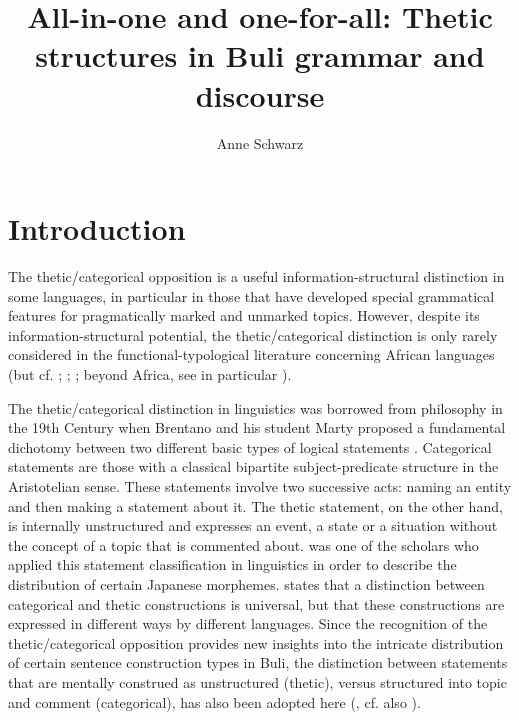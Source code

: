 \documentclass[output=paper]{langsci/langscibook}
\title{All-in-one and one-for-all: Thetic structures in Buli grammar and discourse}
\author{%
 Anne Schwarz \affiliation{Universidad Regional Amazónica IKIAM}
}
\begin{document}
 

\section{Introduction}

The thetic/categorical opposition is a useful information-structural distinction in some languages, in particular in those that have developed special grammatical features for pragmatically marked and unmarked topics. However, despite its information-structural potential, the thetic/categorical distinction is only rarely considered in the functional-typological literature concerning African languages (but cf. \citealt{Güldemann1996,Güldemann2010,Güldemann2012}; \citealt[250-253]{FiedlerEtAl2010}; \citealt{Schwarz2010a}; beyond Africa, see in particular \citealt{Kuroda1972,Sasse1987,Sasse1995,Lambrecht1987,Lambrecht2000,Ulrich1988}). 

The thetic/categorical distinction in linguistics was borrowed from philosophy in the 19th Century when Brentano and his student Marty proposed a fundamental dichotomy between two different basic types of logical statements \citep[535]{Sasse1987}. Categorical statements are those with a classical bipartite subject-predicate structure in the Aristotelian sense. These statements involve two successive acts: naming an entity and then making a statement about it. The thetic statement, on the other hand, is internally unstructured and expresses an event, a state or a situation without the concept of a topic that is commented about. \citet{Kuroda1972} was one of the scholars who applied this statement classification in linguistics in order to describe the distribution of certain Japanese morphemes. \citet[388]{Ulrich1988} states that a distinction between categorical and thetic constructions is universal, but that these constructions are expressed in different ways by different languages. Since the recognition of the thetic/categorical opposition provides new insights into the intricate distribution of certain sentence construction types in Buli, the distinction between statements that are mentally construed as unstructured (thetic), versus structured into topic and comment (categorical), has also been adopted here (, cf. also \citealt{Ulrich1988}). 
 
\end{document}
